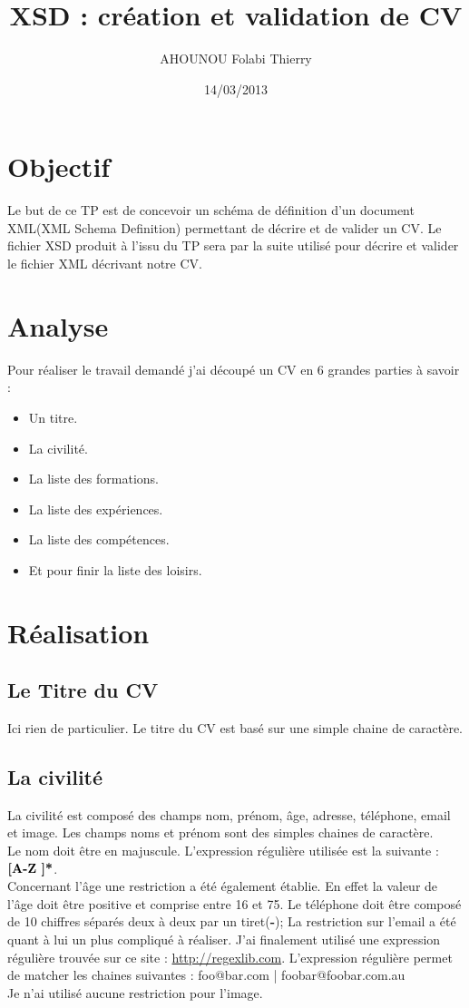 \documentclass[12pt,a4paper]{article}
\author{AHOUNOU Folabi Thierry}
\title{XSD : création et validation de CV}
\date{14/03/2013}
\begin{document}
	\maketitle	
	
	\newpage 	
	
	\section{Objectif}
	Le but de ce TP est de concevoir un schéma de définition d'un document XML(XML Schema Definition) permettant de décrire et de valider 		un CV. Le fichier XSD produit à l'issu du TP sera par la suite utilisé pour décrire et valider le fichier XML décrivant notre CV.
	
	\section{Analyse}
	Pour réaliser le travail demandé j'ai découpé un CV en 6 grandes parties à savoir : 
	\begin{itemize}
		\item Un titre.
		\item La civilité.
		\item La liste des formations.
		\item La liste des expériences.
		\item La liste des compétences.
		\item Et pour finir la liste des loisirs.
	\end{itemize}
	
	\section{Réalisation}
	\subsection{Le Titre du CV}
	Ici rien de particulier. Le titre du CV est basé sur une simple chaine de caractère.
	
	\subsection{La civilité}
	La civilité est composé des champs nom, prénom, âge, adresse, téléphone, email et image. Les champs noms et prénom sont des simples
	chaines de caractère. \\
	Le nom doit être en majuscule. L'expression régulière utilisée est la suivante : $ \textbf{[A-Z \-]*} $.\\
	Concernant l'âge une restriction a été également établie. En effet la valeur de l'âge doit être positive et comprise entre 16 et 75. 
	Le téléphone doit être composé de 10 chiffres séparés deux à deux par un tiret(\textbf{-});
	La restriction sur l'email a été quant à lui un plus compliqué à réaliser. J'ai finalement utilisé une expression régulière trouvée
	sur ce site : \url{http://regexlib.com}. L'expression régulière permet de matcher les chaines suivantes : foo@bar.com | 					foobar@foobar.com.au \\
	Je n'ai utilisé aucune restriction pour l'image.
	
\end{document}

